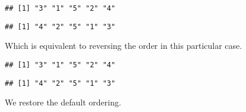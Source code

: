 \documentclass[krantz2]{krantz}\usepackage{knitr}%
\begin{document}
\begin{explainbox}
\begin{knitrout}\footnotesize
{}\color{fgcolor}\begin{kframe}
\begin{alltt}
 \hlkwb{<-} 
                 \hlopt{-}
\hlopt{$}
\end{alltt}
\begin{verbatim}
## [1] "3" "1" "5" "2" "4"
\end{verbatim}
\begin{alltt}
\end{alltt}
\begin{verbatim}
## [1] "4" "2" "5" "1" "3"
\end{verbatim}
\end{kframe}
\end{knitrout}

Which is equivalent to reversing the order in this particular case.

\begin{knitrout}\footnotesize
{}\color{fgcolor}\begin{kframe}
\begin{alltt}
 \hlkwb{<-} 
                 \hlstd{=} \hlstd{(}
\hlopt{$}
\end{alltt}
\begin{verbatim}
## [1] "3" "1" "5" "2" "4"
\end{verbatim}
\begin{alltt}
\end{alltt}
\begin{verbatim}
## [1] "4" "2" "5" "1" "3"
\end{verbatim}
\end{kframe}
\end{knitrout}

We restore the default ordering.


\end{explainbox}
\end{document}
